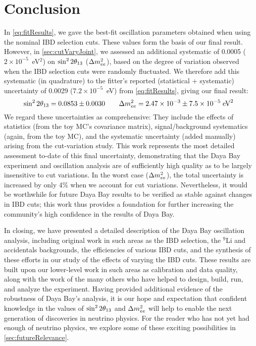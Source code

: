 \documentclass[../thesis.tex]{subfiles}
\begin{document}
\chapter{Conclusion}
\label{chap:conclusion}


In \autoref{eq:fitResults}, we gave the best-fit oscillation parameters obtained when using the nominal IBD selection cuts. These values form the basis of our final result. However, in \autoref{sec:cutVaryJoint}, we assessed an additional systematic of 0.0005 ($2\times10^{-5}$~eV$^2$) on $\sin^2 2\theta_{13}$ ($\Delta m^2_{ee}$), based on the degree of variation observed when the IBD selection cuts were randomly fluctuated. We therefore add this systematic (in quadrature) to the fitter's reported (statistical + systematic) uncertainty of 0.0029 ($7.2\times10^{-5}$~eV) from \autoref{eq:fitResults}, giving our final result:
\begin{equation}
  \sin^2 2\theta_{13} = 0.0853 \pm 0.0030 \qquad \Delta m^2_{ee} = 2.47\times10^{-3} \pm 7.5\times10^{-5}\;\text{eV}^2
\end{equation}
We regard these uncertainties as comprehensive: They include the effects of statistics (from the toy MC's covariance matrix), signal/background systematics (again, from the toy MC), and the systematic uncertainty (added manually) arising from the cut-variation study. This work represents the most detailed assessment to-date of this final uncertainty, demonstrating that the Daya Bay experiment and oscillation analysis are of sufficiently high quality as to be largely insensitive to cut variations. In the worst case ($\Delta m^2_{ee}$), the total uncertainty is increased by only 4\% when we account for cut variations. Nevertheless, it would be worthwhile for future Daya Bay results to be verified as stable against changes in IBD cuts; this work thus provides a foundation for further increasing the community's high confidence in the results of Daya Bay.

In closing, we have presented a detailed description of the Daya Bay oscillation analysis, including original work in such areas as the IBD selection, the $^9$Li and accidentals backgrounds, the efficiencies of various IBD cuts, and the synthesis of these efforts in our study of the effects of varying the IBD cuts. These results are built upon our lower-level work in such areas as calibration and data quality, along with the work of the many others who have helped to design, build, run, and analyze the experiment. Having provided additional evidence of the robustness of Daya Bay's analysis, it is our hope and expectation that confident knowledge in the values of $\sin^2 2\theta_{13}$ and $\Delta m^2_{ee}$ will help to enable the next generation of discoveries in neutrino physics. For the reader who has not yet had enough of neutrino physics, we explore some of these exciting possibilities in \autoref{sec:futureRelevance}.
\end{document}
